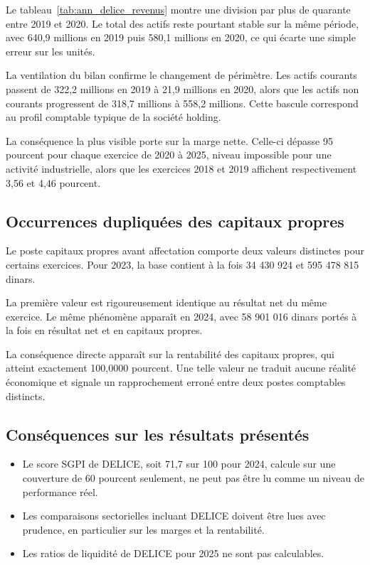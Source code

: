 Le tableau~\ref{tab:ann_delice_revenus} montre une division par plus de
quarante entre 2019 et 2020. Le total des actifs reste pourtant stable sur la
même période, avec 640,9 millions en 2019 puis 580,1 millions en 2020, ce qui
écarte une simple erreur sur les unités.

La ventilation du bilan confirme le changement de périmètre. Les actifs
courants passent de 322,2 millions en 2019 à 21,9 millions en 2020, alors que
les actifs non courants progressent de 318,7 millions à 558,2 millions. Cette
bascule correspond au profil comptable typique de la société holding.

La conséquence la plus visible porte sur la marge nette. Celle-ci dépasse
95 pourcent pour chaque exercice de 2020 à 2025, niveau impossible pour une
activité industrielle, alors que les exercices 2018 et 2019 affichent
respectivement 3,56 et 4,46 pourcent.

\subsection{Occurrences dupliquées des capitaux propres}
Le poste capitaux propres avant affectation comporte deux valeurs distinctes
pour certains exercices. Pour 2023, la base contient à la fois 34 430 924 et
595 478 815 dinars.

La première valeur est rigoureusement identique au résultat net du même
exercice. Le même phénomène apparaît en 2024, avec 58 901 016 dinars portés
à la fois en résultat net et en capitaux propres.

La conséquence directe apparaît sur la rentabilité des capitaux propres, qui
atteint exactement 100,0000 pourcent. Une telle valeur ne traduit aucune
réalité économique et signale un rapprochement erroné entre deux postes
comptables distincts.

\subsection{Conséquences sur les résultats présentés}
\begin{itemize}
  \item Le score SGPI de DELICE, soit 71,7 sur 100 pour 2024, calcule sur une couverture de 60 pourcent seulement, ne peut pas
        être lu comme un niveau de performance réel.
  \item Les comparaisons sectorielles incluant DELICE doivent être lues avec
        prudence, en particulier sur les marges et la rentabilité.
  \item Les ratios de liquidité de DELICE pour 2025 ne sont pas calculables.
\end{itemize}

